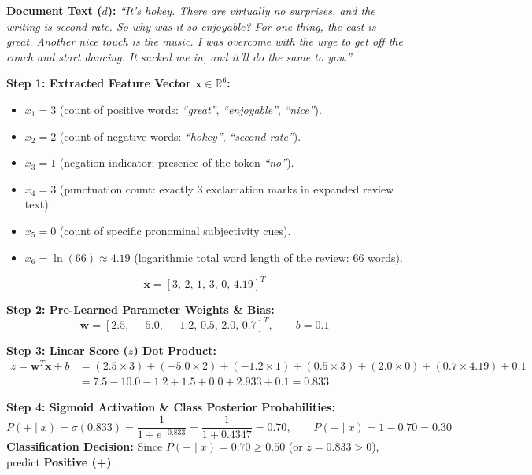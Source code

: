 \documentclass[10pt,a4paper]{article}
\begin{document}
\begin{examplebox}
\par\vspace{1pt}
\textbf{Document Text ($d$):} \textit{``It's hokey. There are virtually no surprises, and the writing is second-rate. So why was it so enjoyable? For one thing, the cast is great. Another nice touch is the music. I was overcome with the urge to get off the couch and start dancing. It sucked me in, and it'll do the same to you.''}

\vspace{1pt}
\noindent\textbf{Step 1: Extracted Feature Vector $\mathbf{x} \in \mathbb{R}^6$:}
\begin{itemize}[leftmargin=12pt, itemsep=0.5pt, parsep=0pt]
    \item $x_1 = 3$ (count of positive words: \textit{``great''}, \textit{``enjoyable''}, \textit{``nice''}).
    \item $x_2 = 2$ (count of negative words: \textit{``hokey''}, \textit{``second-rate''}).
    \item $x_3 = 1$ (negation indicator: presence of the token \textit{``no''}).
    \item $x_4 = 3$ (punctuation count: exactly 3 exclamation marks in expanded review text).
    \item $x_5 = 0$ (count of specific pronominal subjectivity cues).
    \item $x_6 = \ln(66) \approx 4.19$ (logarithmic total word length of the review: $66$ words).
\end{itemize}
$$\mathbf{x} = [3,\, 2,\, 1,\, 3,\, 0,\, 4.19]^T$$

\noindent\textbf{Step 2: Pre-Learned Parameter Weights \& Bias:}
$$\mathbf{w} = [2.5,\, -5.0,\, -1.2,\, 0.5,\, 2.0,\, 0.7]^T, \qquad b = 0.1$$

\noindent\textbf{Step 3: Linear Score ($z$) Dot Product:}
\begin{align*}
z = \mathbf{w}^T \mathbf{x} + b &= (2.5 \times 3) + (-5.0 \times 2) + (-1.2 \times 1) + (0.5 \times 3) + (2.0 \times 0) + (0.7 \times 4.19) + 0.1 \\
&= 7.5 - 10.0 - 1.2 + 1.5 + 0.0 + 2.933 + 0.1 = \mathbf{0.833}
\end{align*}

\noindent\textbf{Step 4: Sigmoid Activation \& Class Posterior Probabilities:}
\[
P(+ \mid x) = \sigma(0.833) = \frac{1}{1 + e^{-0.833}} = \frac{1}{1 + 0.4347} = \mathbf{0.70}, \qquad P(- \mid x) = 1 - 0.70 = \mathbf{0.30}
\]
\textbf{Classification Decision:} Since $P(+ \mid x) = 0.70 \ge 0.50$ (or $z = 0.833 > 0$), predict \textbf{Positive (+)}.


\end{examplebox}
\end{document}

